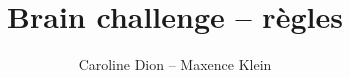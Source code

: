 \documentclass[12pt]{article}
\title{Brain challenge -- r\`egles}
\author{Caroline Dion -- Maxence Klein}
\newcounter{col}
\begin{document}
\towerRules

\bridgesRules

\slantRules

\inequalRules

\rikudoRules

\techtonicRules

\adjacentRules

\kenkenRules

\galaxiesRules

\nurikabeRules

\thermometresRules

\yakusoRules

\bineroRules

\fillingRules

\grecolatinRules

\fenceRules

\yingyangRules

\undeadRules

\campingRules

\numbrixRules

\norinoriRules
\end{document}
